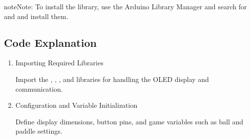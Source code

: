 \documentclass[a4paper,11pt,english]{sphinxmanual}
\begin{document}
\begin{sphinxadmonition}{note}{Note:}
\sphinxAtStartPar
To install the library, use the Arduino Library Manager and search for  and  and install them.
\end{sphinxadmonition}

\sphinxAtStartPar
{}


\subsection{Code Explanation}
\label{\detokenize{Extension_Project/Ping-Pong_Game:code-explanation}}\begin{enumerate}
%
\item {} 
\sphinxAtStartPar
Importing Required Libraries

\sphinxAtStartPar
Import the , , , and  libraries for handling the OLED display and communication.

\begin{sphinxVerbatim}[commandchars=\\\{\}]
\end{sphinxVerbatim}

\item {} 
\sphinxAtStartPar
Configuration and Variable Initialization

\sphinxAtStartPar
Define display dimensions, button pins, and game variables such as ball and paddle settings.


\end{enumerate}
\end{document}
